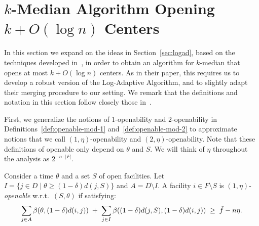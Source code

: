 \section{$k$-Median Algorithm Opening $k + O(\log n)$ Centers}
\label{sec:merging}

In this section we expand on the ideas in Section~\ref{sec:logad}, based on the techniques developed in~\cite{MR4928455-Cohen25}, in order to obtain an algorithm for $k$-median that opens at most $k + O(\log n)$ centers.
As in their paper, this requires us to develop a robust version of the Log-Adaptive Algorithm, and to slightly adapt their merging procedure to our setting.
We remark that the definitions and notation in this section follow closely those in~\cite{MR4928455-Cohen25}.

First, we generalize the notions of $1$-openability and $2$-openability in Definitions~\ref{def:openable-mod-1} and~\ref{def:openable-mod-2} to approximate notions that we call $(1,\eta)$-openability and $(2,\eta)$-openability.
Note that these definitions of openable only depend on $\theta$ and $S$.
We will think of $\eta$ throughout the analysis as $2^{-n \cdot |F|}$.

\begin{definition}
\label{def:openable-mod-eta-1}
Consider a time $\theta$ and a set $S$ of open facilities.
Let $I = \{j \in D \mid \theta \geq (1-\delta) d(j, S)\}$ and $A = D \setminus I$.
A facility $i\in F\setminus S$ is $(1,\eta)$-\emph{openable} w.r.t.\ $(S,\theta)$ if
satisfying:
\[
\sum_{j\in A}\beta(\theta, (1-\delta)d(i,j))
\;+\;
\sum_{j\in I}\beta((1-\delta)d(j,S), (1-\delta)d(i,j))
\;\ge\; \hat f - n \eta.
\]
\end{definition}

